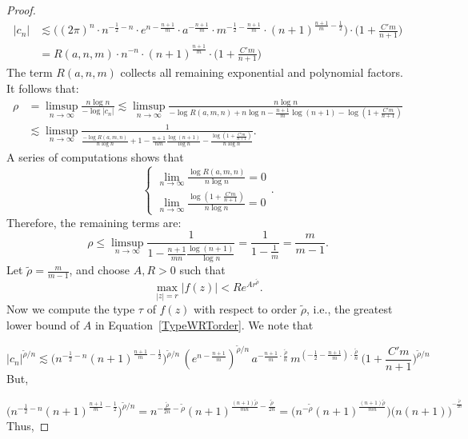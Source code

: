 \documentclass[10pt,a4paper]{amsart}
\begin{document}
\begin{proof}
\begin{align}
              |c_n|
             &\lesssim \Big((2\pi)^n \cdot n^{-\frac{1}{2}-n}\cdot e^{n -\frac{n+1}{m}}\cdot a^{-\frac{n+1}{m}}\cdot m ^{-\frac{1}{2}-\frac{n+1}{m}}\cdot (n+1)^{\frac{n+1}{m}-\frac{1}{2}}\Big)\cdot\Big(1 + \frac{C'm}{n+1}\Big) \\
               &=  R(a,n,m)\cdot n^{-n}\cdot(n+1)^{\frac{n+1}{m}}\cdot\Big(1 + \frac{C'm}{n+1}\Big) \nonumber
        \end{align}
The term $R(a,n,m)$ collects all remaining exponential and polynomial factors. It follows that:
\begin{align*}
    \rho &= \limsup_{n\to\infty} \frac{n \log n}{-\log|c_n|} \lesssim \limsup_{n\to\infty} \frac{n\log n}{-\log R(a,m,n) + n\log n -\frac{n+1}{m}\log(n+1)- \log(1+\frac{C'm}{n+1})}\\
    &\lesssim \limsup_{n\to\infty} \frac{1}{\frac{-\log R(a,m,n)}{n\log n} + 1 -\frac{n+1}{nm}\frac{\log(n+1)}{\log n}- \frac{\log(1+\frac{C'm}{n+1})}{n\log n}}.
\end{align*}
A series of computations shows that $$\begin{cases} \lim_{n\to \infty}\frac{\log R(a,m,n)}{n\log n} =0\\ \lim_{n\to \infty}\frac{\log(1+ \frac{C'm}{n+1})}{n\log n}=0\end{cases}.$$  Therefore, the remaining terms are:
\begin{equation*}   
    \rho \leq \limsup_{n\to \infty}\frac{1}{1-\frac{n+1}{mn}\frac{\log(n+1)}{\log n}}= \frac{1}{1- \frac{1}{m}} = \frac{m}{m-1}.
\end{equation*}
Let $\tilde{\rho} = \frac{m}{m-1}$, and choose $A,R >0$ such that 
\begin{equation}\label{TypeWRTorder}
    \max_{|z|= r}|f(z)| < Re^{Ar^{\tilde{\rho}}}.    
\end{equation}
Now we compute the type $\tau$ of $f(z)$ with respect to order $\tilde{\rho}$, i.e., the greatest lower bound of $A$ in Equation~\eqref{TypeWRTorder}. We note that 

$$ |c_n|^{\tilde{\rho}/n} \lesssim \Big(n^{-\frac{1}{2}-n}(n+1)^{\frac{n+1}{m}-\frac{1}{2}}\Big)^{\tilde{\rho}/n}\, (e^{n - \frac{n+1}{m}})^{\tilde{\rho}/n}\, a^{-\frac{n+1}{m}\cdot \frac{\tilde{\rho}}{n}} \, m ^{(-\frac{1}{2}-\frac{n+1}{m})\cdot \frac{\tilde{\rho}}{n}}\, \Big(1 + \frac{C'm}{n+1}\Big)^{\tilde{\rho}/n} $$ But,

$$\Big(n^{-\frac{1}{2}-n}(n+1)^{\frac{n+1}{m}-\frac{1}{2}}\Big)^{\tilde{\rho}/n} = n^{-\frac{\tilde{\rho}}{2n}-\tilde{\rho}}(n+1)^{\frac{(n+1)\tilde{\rho}}{mn}-\frac{\tilde{\rho}}{2n}}=\Big(n^{-\tilde{\rho}}(n+1)^{\frac{(n+1)\tilde{\rho}}{mn}}\Big)\Big( n(n+1) \Big)^{^{-\frac{\tilde{\rho}}{2n}}}$$
Thus,


\end{proof}
\end{document}
